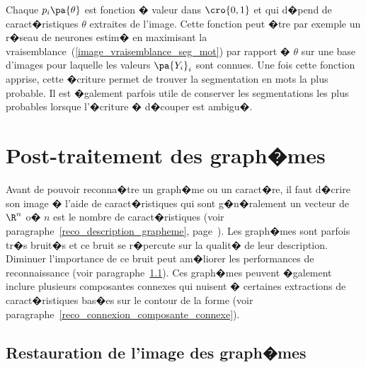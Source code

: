 
Chaque $p_i\pa{\theta}$ est fonction � valeur dans $\cro{0,1}$ et qui d�pend de caract�ristiques $\theta$ extraites de l'image. Cette fonction peut �tre par exemple un r�seau de neurones estim� en maximisant la vraisemblance~(\ref{image_vraisemblance_seg_mot}) par rapport � $\theta$ sur une base d'images pour laquelle les valeurs $\pa{Y_i}_i$ sont connues. Une fois cette fonction apprise, cette �criture permet de trouver la segmentation en mots la plus probable. Il est �galement parfois utile de conserver les segmentations les plus probables lorsque l'�criture � d�couper est ambigu�.









\section{Post-traitement des graph�mes}


Avant de pouvoir reconna�tre un graph�me ou un caract�re, il faut d�crire son image � l'aide de caract�ristiques qui sont g�n�ralement un vecteur de $\R^n$ o� $n$ est le nombre de caract�ristiques (voir paragraphe~\ref{reco_description_grapheme}, page~\pageref{reco_description_grapheme}). Les graph�mes sont parfois tr�s bruit�s et ce bruit se r�percute sur la qualit� de leur description. Diminuer l'importance de ce bruit peut am�liorer les performances de reconnaissance (voir paragraphe~\ref{reco_restauration_image_graheme}). Ces graph�mes peuvent �galement inclure plusieurs composantes connexes qui nuisent � certaines extractions de caract�ristiques bas�es sur le contour de la forme (voir paragraphe~\ref{reco_connexion_composante_connexe}).









\subsection{Restauration de l'image des graph�mes}
\label{reco_restauration_image_graheme}


